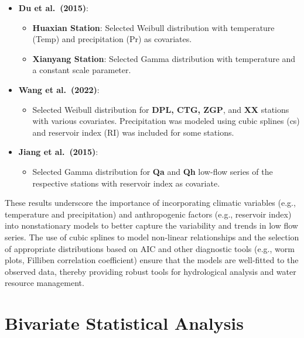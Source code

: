 \documentclass[
]{krantz}
\providecommand{\tightlist}{%
  \setlength{\itemsep}{0pt}\setlength{\parskip}{0pt}}
\begin{document}
\begin{itemize}
\tightlist
\item
  \textbf{Du et al.~(2015)}:

  \begin{itemize}
  \tightlist
  \item
    \textbf{Huaxian Station}: Selected Weibull distribution with temperature (Temp) and precipitation (Pr) as covariates.
  \item
    \textbf{Xianyang Station}: Selected Gamma distribution with temperature and a constant scale parameter.
  \end{itemize}
\item
  \textbf{Wang et al.~(2022)}:

  \begin{itemize}
  \tightlist
  \item
    Selected Weibull distribution for \textbf{DPL, CTG, ZGP}, and \textbf{XX} stations with various covariates. Precipitation was modeled using cubic splines (cs) and reservoir index (RI) was included for some stations.
  \end{itemize}
\item
  \textbf{Jiang et al.~(2015)}:

  \begin{itemize}
  \tightlist
  \item
    Selected Gamma distribution for \textbf{Qa} and \textbf{Qh} low-flow series of the respective stations with reservoir index as covariate.
  \end{itemize}
\end{itemize}

These results underscore the importance of incorporating climatic variables (e.g., temperature and precipitation) and anthropogenic factors (e.g., reservoir index) into nonstationary models to better capture the variability and trends in low flow series. The use of cubic splines to model non-linear relationships and the selection of appropriate distributions based on AIC and other diagnostic tools (e.g., worm plots, Filliben correlation coefficient) ensure that the models are well-fitted to the observed data, thereby providing robust tools for hydrological analysis and water resource management.

\section{Bivariate Statistical Analysis}\label{bivariate-statistical-analysis}
\end{document}
